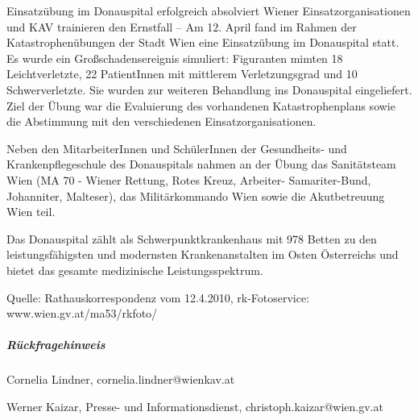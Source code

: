 \hrulefill

\begin{NewsItem}{}{Einsatzübung im Donauspital erfolgreich absolviert}
{Wiener Einsatzorganisationen und KAV trainieren den Ernstfall}
{}
{}
 -- Am 12. April fand im Rahmen der Katastrophenübungen der Stadt Wien
eine Einsatzübung im Donauspital statt. Es wurde ein Großschadensereignis
simuliert: Figuranten mimten 18 Leichtverletzte, 22 PatientInnen mit mittlerem
Verletzungsgrad und 10 Schwerverletzte. Sie wurden zur weiteren Behandlung ins
Donauspital eingeliefert. Ziel der Übung war die Evaluierung des vorhandenen
Katastrophenplans sowie die Abstimmung mit den verschiedenen
Einsatzorganisationen.

Neben den MitarbeiterInnen und SchülerInnen der Gesundheits- und
Krankenpflegeschule des Donauspitals nahmen an der Übung das Sanitätsteam Wien
(MA 70 - Wiener Rettung, Rotes Kreuz, Arbeiter- Samariter-Bund, Johanniter,
Malteser), das Militärkommando Wien sowie die Akutbetreuung Wien teil.

Das Donauspital zählt als Schwerpunktkrankenhaus mit 978 Betten zu den
leistungsfähigsten und modernsten Krankenanstalten im Osten Österreichs und
bietet das gesamte medizinische Leistungsspektrum.

Quelle: Rathauskorrespondenz vom 12.4.2010, rk-Fotoservice:
www.wien.gv.at/ma53/rkfoto/


\subparagraph{Rückfragehinweis}

\begin{compactdesc}
  \scriptsize
  \item[Wiener Krankenanstaltenverbund] Cornelia Lindner, cornelia.lindner@wienkav.at
  \item[Stadt Wien] Werner Kaizar,
  Presse- und Informationsdienst, christoph.kaizar@wien.gv.at
\end{compactdesc}
\end{NewsItem}





